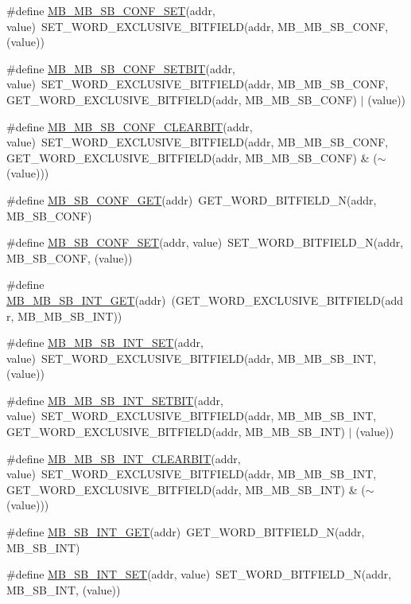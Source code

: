 \begin{DoxyCompactItemize}
\item 
\#define \hyperlink{a00561_a7ba25a30425453daf1591650659e2542}{MB\_\-MB\_\-SB\_\-CONF\_\-SET}(addr, value)~SET\_\-WORD\_\-EXCLUSIVE\_\-BITFIELD(addr, MB\_\-MB\_\-SB\_\-CONF, (value))
\item 
\#define \hyperlink{a00561_a30761659b9323e14e6a7f8d7cb853080}{MB\_\-MB\_\-SB\_\-CONF\_\-SETBIT}(addr, value)~SET\_\-WORD\_\-EXCLUSIVE\_\-BITFIELD(addr, MB\_\-MB\_\-SB\_\-CONF, GET\_\-WORD\_\-EXCLUSIVE\_\-BITFIELD(addr, MB\_\-MB\_\-SB\_\-CONF) $|$ (value))
\item 
\#define \hyperlink{a00561_a1a572c15af1d82a5566098efe20fe26d}{MB\_\-MB\_\-SB\_\-CONF\_\-CLEARBIT}(addr, value)~SET\_\-WORD\_\-EXCLUSIVE\_\-BITFIELD(addr, MB\_\-MB\_\-SB\_\-CONF, GET\_\-WORD\_\-EXCLUSIVE\_\-BITFIELD(addr, MB\_\-MB\_\-SB\_\-CONF) \& ($\sim$(value)))
\item 
\#define \hyperlink{a00561_adfbb669c8aa2cd997ee6ce5e7ece4f76}{MB\_\-SB\_\-CONF\_\-GET}(addr)~GET\_\-WORD\_\-BITFIELD\_\-N(addr, MB\_\-SB\_\-CONF)
\item 
\#define \hyperlink{a00561_a5a793bf5338b5a377408cd3ee601c0fb}{MB\_\-SB\_\-CONF\_\-SET}(addr, value)~SET\_\-WORD\_\-BITFIELD\_\-N(addr, MB\_\-SB\_\-CONF, (value))
\item 
\#define \hyperlink{a00561_aa39509d43793cb575d7ff31867c5cef1}{MB\_\-MB\_\-SB\_\-INT\_\-GET}(addr)~(GET\_\-WORD\_\-EXCLUSIVE\_\-BITFIELD(addr, MB\_\-MB\_\-SB\_\-INT))
\item 
\#define \hyperlink{a00561_a3d0df2b1368c2a4418aca6ab7b6bbad1}{MB\_\-MB\_\-SB\_\-INT\_\-SET}(addr, value)~SET\_\-WORD\_\-EXCLUSIVE\_\-BITFIELD(addr, MB\_\-MB\_\-SB\_\-INT, (value))
\item 
\#define \hyperlink{a00561_afe7e2b0cc7403ee566c3f4c13898c066}{MB\_\-MB\_\-SB\_\-INT\_\-SETBIT}(addr, value)~SET\_\-WORD\_\-EXCLUSIVE\_\-BITFIELD(addr, MB\_\-MB\_\-SB\_\-INT, GET\_\-WORD\_\-EXCLUSIVE\_\-BITFIELD(addr, MB\_\-MB\_\-SB\_\-INT) $|$ (value))
\item 
\#define \hyperlink{a00561_a30df586baebde7fcfcea1f68801b56fc}{MB\_\-MB\_\-SB\_\-INT\_\-CLEARBIT}(addr, value)~SET\_\-WORD\_\-EXCLUSIVE\_\-BITFIELD(addr, MB\_\-MB\_\-SB\_\-INT, GET\_\-WORD\_\-EXCLUSIVE\_\-BITFIELD(addr, MB\_\-MB\_\-SB\_\-INT) \& ($\sim$(value)))
\item 
\#define \hyperlink{a00561_ad966d6962a8b2529cccb54b16f0b00a9}{MB\_\-SB\_\-INT\_\-GET}(addr)~GET\_\-WORD\_\-BITFIELD\_\-N(addr, MB\_\-SB\_\-INT)
\item 
\#define \hyperlink{a00561_a0672361cdba82e71acda4117f10aa011}{MB\_\-SB\_\-INT\_\-SET}(addr, value)~SET\_\-WORD\_\-BITFIELD\_\-N(addr, MB\_\-SB\_\-INT, (value))

\end{DoxyCompactItemize}
